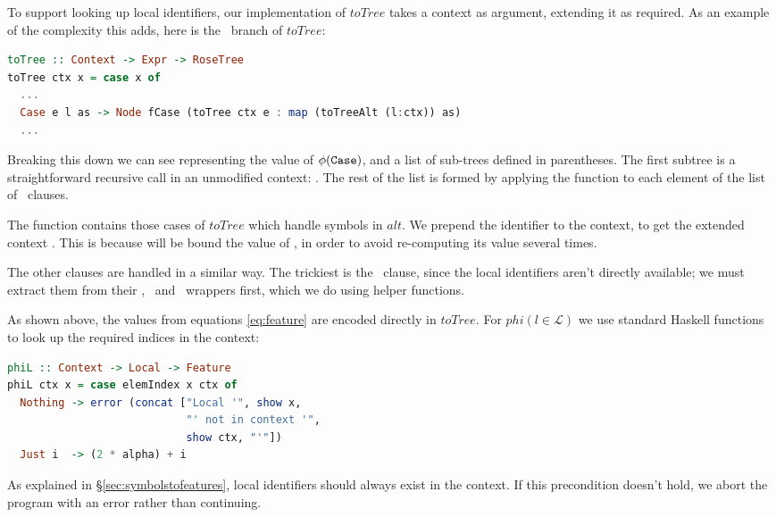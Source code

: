 To support looking up local identifiers, our implementation of $toTree$ takes a
context as argument, extending it as required. As an example of the complexity
this adds, here is the \CCase\ branch of $toTree$:

\begin{lstlisting}[language=Haskell, xleftmargin=0pt, xrightmargin=0pt]
toTree :: Context -> Expr -> RoseTree
toTree ctx x = case x of
  ...
  Case e l as -> Node fCase (toTree ctx e : map (toTreeAlt (l:ctx)) as)
  ...
\end{lstlisting}

Breaking this down we can see  representing the value of
$\phi(\texttt{Case})$, and a list of sub-trees defined in parentheses. The first
subtree is a straightforward recursive call in an unmodified context:
\mbox{}. The rest of the list is formed by applying the
function \mbox{} to each element of the list  of
\CAlt\ clauses.

The  function contains those cases of $toTree$ which handle
symbols in $alt$. We prepend the identifier  to the context, to get the
extended context . This is because  will be bound the value of
, in order to avoid re-computing its value several times.

The other clauses are handled in a similar way. The trickiest is the \CLet\
clause, since the local identifiers aren't directly available; we must extract
them from their \CRec, \CNonRec\ and \CBind\ wrappers first, which we do using
helper functions.

As shown above, the values from equations \ref{eq:feature} are encoded directly
in $toTree$. For $phi(l \in \mathcal{L})$ we use standard Haskell functions to
look up the required indices in the context:

\begin{lstlisting}[language=Haskell, xleftmargin=0.1\textwidth, xrightmargin=0.1\textwidth]
phiL :: Context -> Local -> Feature
phiL ctx x = case elemIndex x ctx of
  Nothing -> error (concat ["Local '", show x,
                            "' not in context '",
                            show ctx, "'"])
  Just i  -> (2 * alpha) + i
\end{lstlisting}

As explained in \S \ref{sec:symbolstofeatures}, local identifiers should always
exist in the context. If this precondition doesn't hold, we abort the program
with an error rather than continuing.


